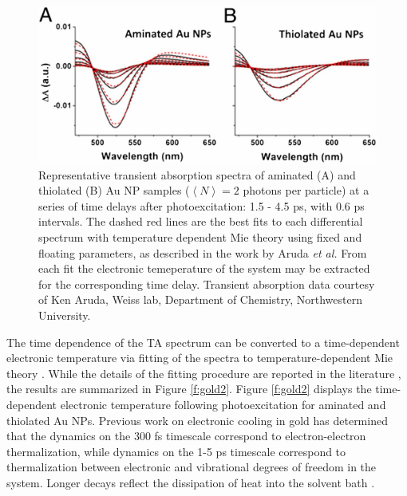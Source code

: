 \begin{figure}
\begin{center}
\includegraphics[width=\textwidth]{./Chapter2/gold1.jpg}
\caption[Representative transient absorption spectra of aminated and thiolated Au NP samples.]{Representative transient absorption spectra of aminated (A) and thiolated (B) Au NP samples ($\left\langle N\right\rangle = 2$ photons per particle) at a series of time delays after photoexcitation: 1.5 - 4.5 ps, with 0.6 ps intervals. The dashed red lines are the best fits to each differential spectrum with temperature dependent Mie theory using fixed and floating parameters, as described in the work by Aruda \emph{et al.} \cite{aruda2013identification} From each fit the electronic temeperature of the system may be extracted for the corresponding time delay. Transient absorption data courtesy of Ken Aruda, Weiss lab, Department of Chemistry, Northwestern University.}
\label{f:gold1}
\end{center}
\end{figure}

The time dependence of the TA spectrum can be converted to a time-dependent electronic temperature via fitting of the spectra to temperature-dependent Mie theory \cite{scaffardi2006size,rosei1973d,inouye1998ultrafast}. While the details of the fitting procedure are reported in the literature \cite{aruda2013identification}, the results are summarized in Figure \ref{f:gold2}. Figure \ref{f:gold2} displays the time-dependent electronic temperature following photoexcitation for aminated and thiolated Au NPs. Previous work on electronic cooling in gold has determined that the dynamics on the 300 fs timescale correspond to electron-electron thermalization, while dynamics on the 1-5 ps timescale correspond to thermalization between electronic and vibrational degrees of freedom in the system. Longer decays reflect the dissipation of heat into the solvent bath \cite{link2002hot}. \par

